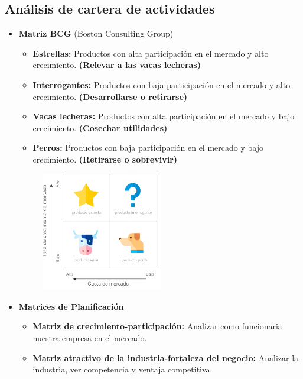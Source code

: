 \documentclass{templateNote}
\begin{document}
\subsection{Análisis de cartera de actividades}
    \begin{itemize}
        \item \textbf{Matriz BCG} (Boston Consulting Group)
        \begin{itemize}
            \item \textbf{Estrellas:} Productos con alta participación en el mercado y alto crecimiento. \textbf{(Relevar a las vacas lecheras)}
            \item \textbf{Interrogantes:} Productos con baja participación en el mercado y alto crecimiento. \textbf{(Desarrollarse o retirarse)}
            \item \textbf{Vacas lecheras:} Productos con alta participación en el mercado y bajo crecimiento. \textbf{(Cosechar utilidades)}
            \item \textbf{Perros:} Productos con baja participación en el mercado y bajo crecimiento. \textbf{(Retirarse o sobrevivir)}
        \end{itemize}
        \begin{figure}[H]
            \centering
            \includegraphics[width=0.5\textwidth]{img/matriz_bcg-768x803.png}
        \end{figure}
        \item \textbf{Matrices de Planificación}
        \begin{itemize}
            \item \textbf{Matriz de crecimiento-participación:} Analizar como funcionaria nuestra empresa en el mercado.
            \item \textbf{Matriz atractivo de la industria-fortaleza del negocio:} Analizar la industria, ver competencia y ventaja competitiva.
            \begin{figure}[H]

\end{figure}
\end{itemize}
\end{itemize}
\end{document}
